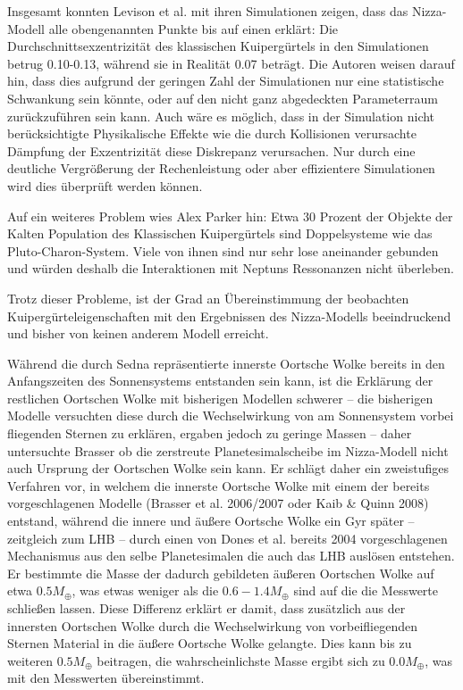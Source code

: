 \documentclass[10pt,a4paper,twoside]{article}
\begin{document}
Insgesamt konnten Levison et al. mit ihren Simulationen zeigen, dass das Nizza-Modell alle obengenannten Punkte bis auf einen erklärt: Die Durchschnittsexzentrizität des klassischen Kuipergürtels in den Simulationen betrug 0.10-0.13, während sie in Realität 0.07 beträgt\cite{Levison2008}.
Die Autoren weisen darauf hin, dass dies aufgrund der geringen Zahl der Simulationen nur eine statistische Schwankung sein könnte, oder auf den nicht ganz abgedeckten Parameterraum zurückzuführen sein kann\cite{Levison2008}. Auch wäre es möglich, dass in der Simulation nicht berücksichtigte Physikalische Effekte wie die durch Kollisionen verursachte Dämpfung der Exzentrizität diese Diskrepanz verursachen\cite{Levison2008}.
Nur durch eine deutliche Vergrößerung der Rechenleistung oder aber effizientere Simulationen wird dies überprüft werden können.

Auf ein weiteres Problem wies Alex Parker hin: %
Etwa 30 Prozent der Objekte der Kalten Population des Klassischen Kuipergürtels sind Doppelsysteme wie das Pluto-Charon-System. %
Viele von ihnen sind nur sehr lose aneinander gebunden und würden deshalb die Interaktionen mit Neptuns Ressonanzen nicht überleben. %

Trotz dieser Probleme, ist der Grad an Übereinstimmung der beobachten Kuipergürteleigenschaften mit den Ergebnissen des Nizza-Modells beeindruckend und bisher von keinen anderem Modell erreicht. %

Während die durch Sedna repräsentierte innerste Oortsche Wolke bereits in den Anfangszeiten des Sonnensystems entstanden sein kann, ist die Erklärung der restlichen Oortschen Wolke mit bisherigen Modellen schwerer – die bisherigen Modelle versuchten diese durch die Wechselwirkung von am Sonnensystem vorbei fliegenden Sternen zu erklären, ergaben jedoch zu geringe Massen – daher untersuchte Brasser ob die zerstreute Planetesimalscheibe im Nizza-Modell nicht auch Ursprung der Oortschen Wolke sein kann\cite{Brasser2008}.
Er schlägt daher ein zweistufiges Verfahren vor, in welchem die innerste Oortsche Wolke mit einem der bereits vorgeschlagenen Modelle (Brasser et al. 2006/2007 oder Kaib \& Quinn 2008) entstand, während die innere und äußere Oortsche Wolke ein Gyr später – zeitgleich zum LHB – durch einen von Dones et al. bereits 2004 vorgeschlagenen Mechanismus aus den selbe Planetesimalen die auch das LHB auslösen entstehen\cite{Brasser2008}. %
Er bestimmte die Masse der dadurch gebildeten äußeren Oortschen Wolke auf etwa $0.5 M_\oplus$, was etwas weniger als die $0.6-1.4 M_\oplus$ sind auf die die Messwerte schließen lassen\cite{Brasser2008}. Diese Differenz erklärt er damit, dass zusätzlich aus der innersten Oortschen Wolke durch die Wechselwirkung von vorbeifliegenden Sternen Material in die äußere Oortsche Wolke gelangte\cite{Brasser2008}.
Dies kann bis zu weiteren $0.5 M_\oplus$ beitragen, die wahrscheinlichste Masse ergibt sich zu $0.0 M_\oplus$, was mit den Messwerten übereinstimmt\cite{Brasser2008}.
\end{document}
